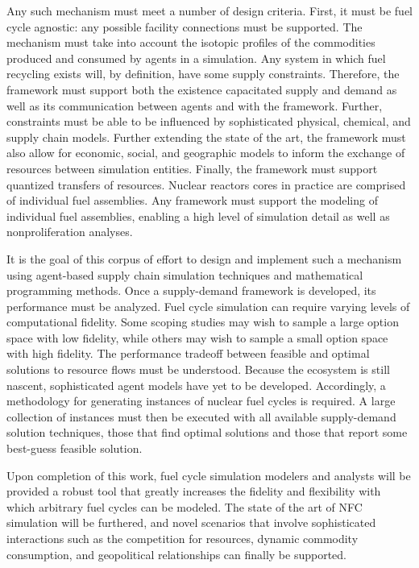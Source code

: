 Any such mechanism must meet a number of design criteria. First, it must be fuel
cycle agnostic: any possible facility connections must be supported. The
mechanism must take into account the isotopic profiles of the commodities
produced and consumed by agents in a simulation. Any system in which fuel
recycling exists will, by definition, have some supply constraints. Therefore,
the framework must support both the existence capacitated supply and demand as
well as its communication between agents and with the framework. Further,
constraints must be able to be influenced by sophisticated physical, chemical,
and supply chain models. Further extending the state of the art, the framework
must also allow for economic, social, and geographic models to inform the
exchange of resources between simulation entities. Finally, the framework must
support quantized transfers of resources. Nuclear reactors cores in practice are
comprised of individual fuel assemblies. Any framework must support the modeling
of individual fuel assemblies, enabling a high level of simulation detail as
well as nonproliferation analyses.

It is the goal of this corpus of effort to design and implement such a mechanism
using agent-based supply chain simulation techniques and mathematical
programming methods.  Once a supply-demand framework is developed, its
performance must be analyzed. Fuel cycle simulation can require varying levels
of computational fidelity. Some scoping studies may wish to sample a large
option space with low fidelity, while others may wish to sample a small option
space with high fidelity. The performance tradeoff between feasible and optimal
solutions to resource flows must be understood. Because the \Cyclus ecosystem is
still nascent, sophisticated agent models have yet to be developed. Accordingly,
a methodology for generating instances of nuclear fuel cycles is required. A
large collection of instances must then be executed with all available
supply-demand solution techniques, those that find optimal solutions and those
that report some best-guess feasible solution.

Upon completion of this work, fuel cycle simulation modelers and analysts will
be provided a robust tool that greatly increases the fidelity and flexibility
with which arbitrary fuel cycles can be modeled. The state of the art of NFC
simulation will be furthered, and novel scenarios that involve sophisticated
interactions such as the competition for resources, dynamic commodity
consumption, and geopolitical relationships can finally be supported.
